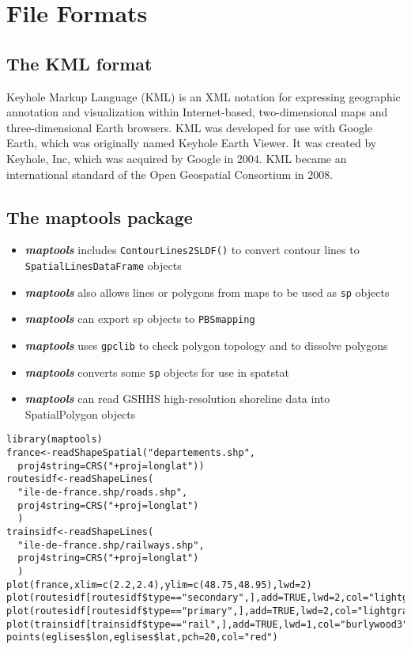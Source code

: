 \documentclass[12pt]{article}
\begin{document}
\section*{File Formats}


\subsection*{The KML format}

Keyhole Markup Language (KML) is an XML notation for expressing geographic annotation and visualization within Internet-based, two-dimensional maps and three-dimensional Earth browsers. KML was developed for use with Google Earth, which was originally named Keyhole Earth Viewer. It was created by Keyhole, Inc, which was acquired by Google in 2004. KML became an international standard of the Open Geospatial Consortium in 2008.

\subsection{The maptools package}
\begin{itemize}
\item \textit{\textbf{maptools}} includes \texttt{ContourLines2SLDF()} to convert contour lines
to \texttt{SpatialLinesDataFrame} objects
\item \textit{\textbf{maptools}} also allows lines or polygons from maps to be used as \texttt{sp}
objects
\item \textit{\textbf{maptools}} can export sp objects to \texttt{PBSmapping}
\item \textit{\textbf{maptools}} uses \texttt{gpclib} to check polygon topology and to dissolve
polygons
\item \textit{\textbf{maptools}} converts some \texttt{sp} objects for use in spatstat
\item \textit{\textbf{maptools}} can read GSHHS high-resolution shoreline data into
SpatialPolygon objects
\end{itemize}

\begin{framed}
\begin{verbatim}
library(maptools)
france<-readShapeSpatial("departements.shp",
  proj4string=CRS("+proj=longlat"))
routesidf<-readShapeLines(
  "ile-de-france.shp/roads.shp",
  proj4string=CRS("+proj=longlat")
  )
trainsidf<-readShapeLines(
  "ile-de-france.shp/railways.shp",
  proj4string=CRS("+proj=longlat")
  )
plot(france,xlim=c(2.2,2.4),ylim=c(48.75,48.95),lwd=2)
plot(routesidf[routesidf$type=="secondary",],add=TRUE,lwd=2,col="lightgray")
plot(routesidf[routesidf$type=="primary",],add=TRUE,lwd=2,col="lightgray")
plot(trainsidf[trainsidf$type=="rail",],add=TRUE,lwd=1,col="burlywood3")
points(eglises$lon,eglises$lat,pch=20,col="red")
\end{verbatim}
\end{framed}
\end{document}
